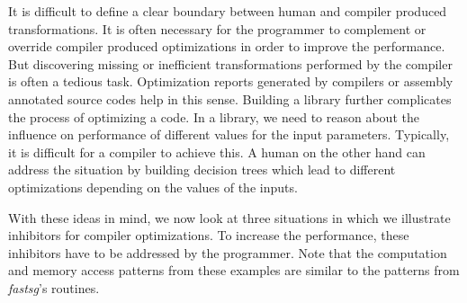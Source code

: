 

It is difficult to define a clear boundary between human and compiler produced
transformations. It is often necessary for the programmer to complement or
override compiler produced optimizations in order to improve the performance.
But discovering missing or inefficient transformations performed by the compiler
is often a tedious task. Optimization reports  generated by compilers or
assembly annotated source codes help in this sense. Building a library further
complicates the process of optimizing a code.
In a library, we need to reason about the influence on performance of different
values for the input parameters. Typically, it is difficult for a compiler to
achieve this. A human on the other hand can address the situation by building
decision trees which lead to different optimizations depending on the values of
the inputs.

With these ideas in mind, we now look at three situations in which we illustrate
inhibitors for compiler optimizations. To increase the performance, these
inhibitors have to be addressed by the programmer. Note that the computation and
memory access patterns from these examples are similar to the patterns from
\textit{fastsg}'s routines.

\setcounter{algorithm}{0}

